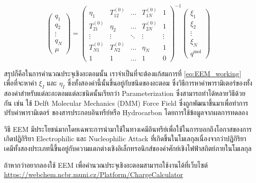 \begin{equation}
  \label{eq:EEM_working}
  \left(\begin{array}{c}
      q_1    \\
      q_2    \\
      \vdots \\
      q_N    \\
      \mu
    \end{array}\right)
  =
  \left(\begin{array}{ccccc}
    \eta_1        & T_{12}^{(0)}  & \ldots & T_{1 N}^{(0)} & 1      \\
    T_{21}^{(0)}  & \eta_2        & \ldots & T_{2 N}^{(0)} & 1      \\
    \vdots        & \vdots        & \ddots & \vdots        & \vdots \\
    T_{N 1}^{(0)} & T_{N 2}^{(0)} & \ldots & \eta_N        & 1      \\
    1             & 1             & \ldots & 1             & 0
  \end{array}\right)^{-1}\left(\begin{array}{c}
      \xi_1  \\
      \xi_2  \\
      \vdots \\
      \xi_N  \\
      q^{\mathrm{mol}}
    \end{array}\right)
\end{equation}

สรุปก็คือในการคำนวณประจุเชิงอะตอมนั้น เราจำเป็นที่จะต้องแก้สมการที่ \eqref{eq:EEM_working} เพื่อที่จะหาค่า $\xi_I$ และ $\eta_I$
ซึ่งทั้งสองค่านี้นั้นขึ้นอยู่กับชนิดของอะตอม ซึ่งวิธีการหาค่าพารามิเตอร์ของทั้งสองค่าสำหรับแต่ละอะตอมแต่ละชนิดนั้นเรียกว่า Parameterization
ซึ่งสามารถทำได้หลายวิธีด้วยกัน เช่น ใช้ Delft Molecular Mechanics (DMM) Force Field ซึ่งถูกพัฒนาขึ้นมาเพื่อทำการปรับค่าพารามิเตอร์%
ของสารประกอบอินทรีย์หรือ Hydrocarbon โดยการใช้ข้อมูลจากผลการทดลอง

วิธี EEM มีประโยชน์มากโดยเฉพาะการนำมาใช้ในทางเคมีอินทรีย์เพื่อใช้ในการบอกถึงโอกาสของการเกิดปฏิกิริยา Electrophilic และ Nucleophilic
Attack ที่เกิดขึ้นในโมเลกุลเนื่องจากว่าปฏิกิริยาเคมีทั้งสองประเภทนี้ขึ้นอยู่กับความแตกต่างเชิงอิเล็กทรอนิกส์ของค่าศักย์เชิงไฟฟ้าสถิตย์ภายในโมเลกุล

ถ้าหากว่าอยากลองใช้ EEM เพื่อคำนวณประจุเชิงอะตอมสามารถใช้งานได้ที่เว็บไซต์ \url{https://webchem.ncbr.muni.cz/Platform/ChargeCalculator}

